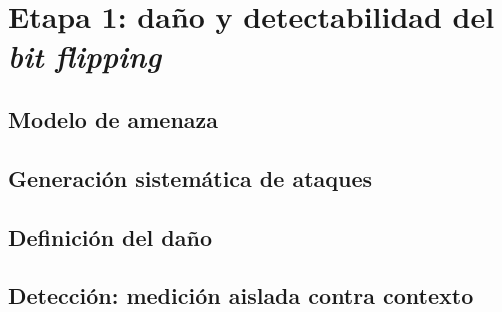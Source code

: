 \chapter{Etapa 1: daño y detectabilidad del \textit{bit flipping}}
\label{cap:bit-flipping}

\section{Modelo de amenaza}
\label{sec:amenaza}

\section{Generación sistemática de ataques}
\label{sec:generacion}

\section{Definición del daño}
\label{sec:dano}

\section{Detección: medición aislada contra contexto}
\label{sec:deteccion-e1}

